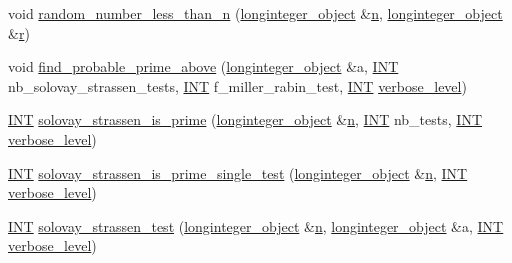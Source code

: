 \begin{DoxyCompactItemize}
\item 
void \mbox{\hyperlink{classlonginteger__domain_a1b04f1721c5b5d8df684344e0d94cb2b}{random\+\_\+number\+\_\+less\+\_\+than\+\_\+n}} (\mbox{\hyperlink{classlonginteger__object}{longinteger\+\_\+object}} \&\mbox{\hyperlink{simeon_8_c_a7f2cd26777ce0ff3fdaf8d02aacbddfb}{n}}, \mbox{\hyperlink{classlonginteger__object}{longinteger\+\_\+object}} \&\mbox{\hyperlink{alphabet2_8_c_acab531abaa74a7e664e3986f2522b33a}{r}})
\item 
void \mbox{\hyperlink{classlonginteger__domain_a46944b99c740242bfe23a86b50d6a60d}{find\+\_\+probable\+\_\+prime\+\_\+above}} (\mbox{\hyperlink{classlonginteger__object}{longinteger\+\_\+object}} \&a, \mbox{\hyperlink{galois_8h_a09fddde158a3a20bd2dcadb609de11dc}{I\+NT}} nb\+\_\+solovay\+\_\+strassen\+\_\+tests, \mbox{\hyperlink{galois_8h_a09fddde158a3a20bd2dcadb609de11dc}{I\+NT}} f\+\_\+miller\+\_\+rabin\+\_\+test, \mbox{\hyperlink{galois_8h_a09fddde158a3a20bd2dcadb609de11dc}{I\+NT}} \mbox{\hyperlink{simeon_8_c_a818073fbcc2f439e7c56952f67386122}{verbose\+\_\+level}})
\item 
\mbox{\hyperlink{galois_8h_a09fddde158a3a20bd2dcadb609de11dc}{I\+NT}} \mbox{\hyperlink{classlonginteger__domain_a8161357a52c022f146b273a73f29edc8}{solovay\+\_\+strassen\+\_\+is\+\_\+prime}} (\mbox{\hyperlink{classlonginteger__object}{longinteger\+\_\+object}} \&\mbox{\hyperlink{simeon_8_c_a7f2cd26777ce0ff3fdaf8d02aacbddfb}{n}}, \mbox{\hyperlink{galois_8h_a09fddde158a3a20bd2dcadb609de11dc}{I\+NT}} nb\+\_\+tests, \mbox{\hyperlink{galois_8h_a09fddde158a3a20bd2dcadb609de11dc}{I\+NT}} \mbox{\hyperlink{simeon_8_c_a818073fbcc2f439e7c56952f67386122}{verbose\+\_\+level}})
\item 
\mbox{\hyperlink{galois_8h_a09fddde158a3a20bd2dcadb609de11dc}{I\+NT}} \mbox{\hyperlink{classlonginteger__domain_a818b8c30812875d45041a6aaaa335589}{solovay\+\_\+strassen\+\_\+is\+\_\+prime\+\_\+single\+\_\+test}} (\mbox{\hyperlink{classlonginteger__object}{longinteger\+\_\+object}} \&\mbox{\hyperlink{simeon_8_c_a7f2cd26777ce0ff3fdaf8d02aacbddfb}{n}}, \mbox{\hyperlink{galois_8h_a09fddde158a3a20bd2dcadb609de11dc}{I\+NT}} \mbox{\hyperlink{simeon_8_c_a818073fbcc2f439e7c56952f67386122}{verbose\+\_\+level}})
\item 
\mbox{\hyperlink{galois_8h_a09fddde158a3a20bd2dcadb609de11dc}{I\+NT}} \mbox{\hyperlink{classlonginteger__domain_a91e8824ed631a5b32239e3d9027d6578}{solovay\+\_\+strassen\+\_\+test}} (\mbox{\hyperlink{classlonginteger__object}{longinteger\+\_\+object}} \&\mbox{\hyperlink{simeon_8_c_a7f2cd26777ce0ff3fdaf8d02aacbddfb}{n}}, \mbox{\hyperlink{classlonginteger__object}{longinteger\+\_\+object}} \&a, \mbox{\hyperlink{galois_8h_a09fddde158a3a20bd2dcadb609de11dc}{I\+NT}} \mbox{\hyperlink{simeon_8_c_a818073fbcc2f439e7c56952f67386122}{verbose\+\_\+level}})

\end{DoxyCompactItemize}
